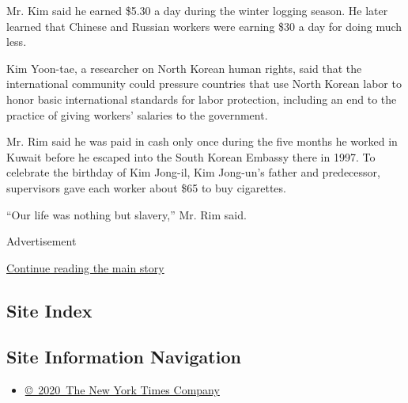 Mr. Kim said he earned \$5.30 a day during the winter logging season. He
later learned that Chinese and Russian workers were earning \$30 a day
for doing much less.

Kim Yoon-tae, a researcher on North Korean human rights, said that the
international community could pressure countries that use North Korean
labor to honor basic international standards for labor protection,
including an end to the practice of giving workers' salaries to the
government.

Mr. Rim said he was paid in cash only once during the five months he
worked in Kuwait before he escaped into the South Korean Embassy there
in 1997. To celebrate the birthday of Kim Jong-il, Kim Jong-un's father
and predecessor, supervisors gave each worker about \$65 to buy
cigarettes.

``Our life was nothing but slavery,'' Mr. Rim said.

Advertisement

\protect\hyperlink{after-bottom}{Continue reading the main story}

\hypertarget{site-index}{%
\subsection{Site Index}\label{site-index}}

\hypertarget{site-information-navigation}{%
\subsection{Site Information
Navigation}\label{site-information-navigation}}

\begin{itemize}
\tightlist
\item
  \href{https://help.nytimes3xbfgragh.onion/hc/en-us/articles/115014792127-Copyright-notice}{©~2020~The
  New York Times Company}
\end{itemize}

